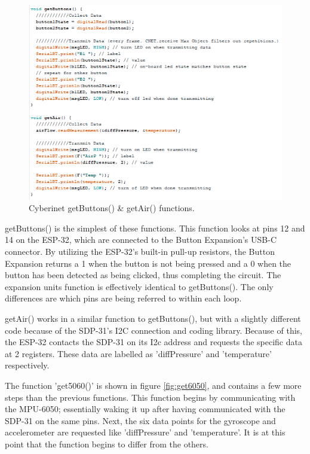 \begin{center}
    \begin{figure}
        \centering
        \includegraphics[scale=1.5]{diagrams/maxPatches/getbuttonsgetair.png}
        \caption{Cyberinet getButtons() \& getAir() functions.}
        \label{fig:getButtonsGetAir}
    \end{figure}
\end{center}

getButtons() is the simplest of these functions. This function looks at pins 12 and 14 on the ESP-32, which are connected to the Button Expansion's USB-C connector. By utilizing the ESP-32's built-in pull-up resistors, the Button Expansion returns a 1 when the button is not being pressed and a 0 when the button has been detected as being clicked, thus completing the circuit. The expansion units function is effectively identical to getButtons(). The only differences are which pins are being referred to within each loop.

getAir() works in a similar function to getButtons(), but with a slightly different code because of the SDP-31's I2C connection and coding library. Because of this, the ESP-32 contacts the SDP-31 on its I2c address and requests the specific data at 2 registers. These data are labelled as 'diffPressure' and 'temperature' respectively. 

The function 'get5060()' is shown in figure \ref{fig:get6050}, and contains a few more steps than the previous functions. This function begins by communicating with the MPU-6050; essentially waking it up after having communicated with the SDP-31 on the same pins. Next, the six data points for the gyroscope and accelerometer are requested like 'diffPressure' and 'temperature'. It is at this point that the function begins to differ from the others.

